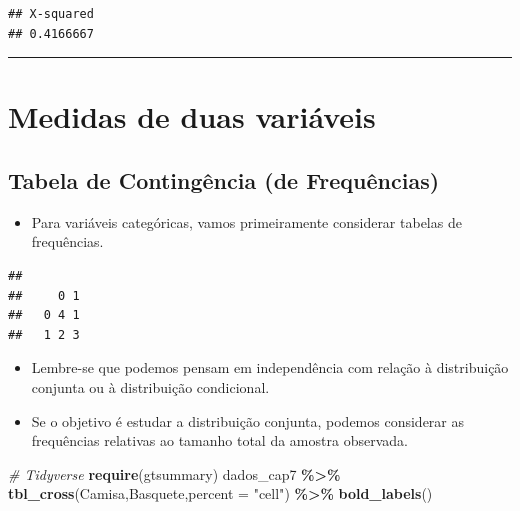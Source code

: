 \documentclass[
]{book}
\newenvironment{Shaded}{\begin{snugshade}}{\end{snugshade}}
\newcommand{\AttributeTok}[1]{\textcolor[rgb]{0.13,0.29,0.53}{#1}}
\newcommand{\CommentTok}[1]{\textcolor[rgb]{0.56,0.35,0.01}{\textit{#1}}}
\newcommand{\FunctionTok}[1]{\textcolor[rgb]{0.13,0.29,0.53}{\textbf{#1}}}
\newcommand{\NormalTok}[1]{#1}
\newcommand{\OtherTok}[1]{\textcolor[rgb]{0.56,0.35,0.01}{#1}}
\newcommand{\SpecialCharTok}[1]{\textcolor[rgb]{0.81,0.36,0.00}{\textbf{#1}}}
\newcommand{\StringTok}[1]{\textcolor[rgb]{0.31,0.60,0.02}{#1}}
\providecommand{\tightlist}{%
  \setlength{\itemsep}{0pt}\setlength{\parskip}{0pt}}
\begin{document}
\begin{verbatim}
## X-squared 
## 0.4166667
\end{verbatim}

\begin{center}\rule{0.5\linewidth}{0.5pt}\end{center}

\chapter{Medidas de duas variáveis}\label{medidas_duas_va}

\section{Tabela de Contingência (de Frequências)}\label{tabela-de-continguxeancia-de-frequuxeancias}

\begin{itemize}
\tightlist
\item
  Para variáveis categóricas, vamos primeiramente considerar tabelas de frequências.
\end{itemize}

\begin{Shaded}
\end{Shaded}

\begin{verbatim}
##    
##     0 1
##   0 4 1
##   1 2 3
\end{verbatim}

\begin{itemize}
\item
  Lembre-se que podemos pensam em independência com relação à distribuição conjunta ou à distribuição condicional.
\item
  Se o objetivo é estudar a distribuição conjunta, podemos considerar as frequências relativas ao tamanho total da amostra observada.
\end{itemize}

\begin{Shaded}
\begin{Highlighting}[]
\CommentTok{\# Tidyverse}
\FunctionTok{require}\NormalTok{(gtsummary)}
\NormalTok{dados\_cap7 }\SpecialCharTok{\%\textgreater{}\%} \FunctionTok{tbl\_cross}\NormalTok{(Camisa,Basquete,}\AttributeTok{percent =} \StringTok{"cell"}\NormalTok{) }\SpecialCharTok{\%\textgreater{}\%} 
  \FunctionTok{bold\_labels}\NormalTok{()}
\end{Highlighting}
\end{Shaded}
\end{document}
